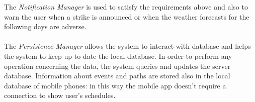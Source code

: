 The \textit{Notification Manager} is used to satisfy the requirements above and also to warn the user when a strike is announced or when the weather forecasts for the following days are adverse.\\\\
The \textit{Persistence Manager} allows the system to interact with database and helps the system to keep up-to-date the local database. In order to perform any operation concerning the data, the system queries and updates the server database. Information about events and paths are stored also in the local database of mobile phones: in this way the mobile app doesn't require a connection to show user's schedules. 